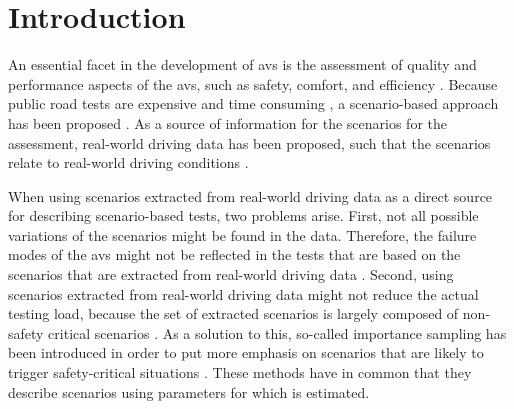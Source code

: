 \section{Introduction}
\label{sec:introduction}

An essential facet in the development of \acp{av} is the assessment of quality and performance aspects of the \acp{av}, such as safety, comfort, and efficiency \autocite{bengler2014threedecades, stellet2015taxonomy, koopman2016challenges}. 
Because public road tests are expensive and time consuming \autocite{kalra2016driving, zhao2018evaluation}, a scenario-based approach has been proposed \autocite{riedmaier2020survey, elrofai2018scenario, putz2017pegasus, krajewski2018highD, deGelder2017assessment, stellet2015taxonomy, jacobo2019development}.
As a source of information for the scenarios for the assessment, real-world driving data has been proposed, such that the scenarios relate to real-world driving conditions \autocite{elrofai2018scenario, putz2017pegasus, krajewski2018highD}.

When using scenarios extracted from real-world driving data as a direct source for describing scenario-based tests, two problems arise.
First, not all possible variations of the scenarios might be found in the data. 
Therefore, the failure modes of the \acp{av} might not be reflected in the tests that are based on the scenarios that are extracted from real-world driving data \autocite{zhao2018evaluation}.
Second, using scenarios extracted from real-world driving data might not reduce the actual testing load, because the set of extracted scenarios is largely composed of non-safety critical scenarios \autocite{zhao2018evaluation}.
As a solution to this, so-called importance sampling has been introduced in order to put more emphasis on scenarios that are likely to trigger safety-critical situations \autocite{deGelder2017assessment, xu2018accelerated, zhao2018evaluation, jesenski2020scalable}.
These methods \autocite{deGelder2017assessment, xu2018accelerated, zhao2018evaluation, jesenski2020scalable} have in common that they describe scenarios using parameters for which  is estimated.

